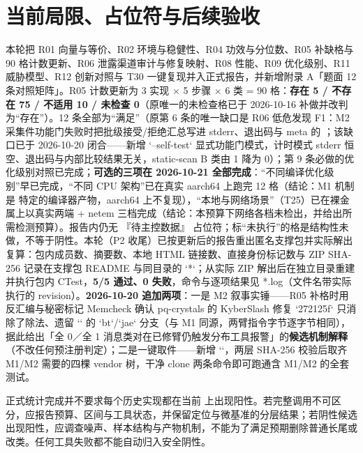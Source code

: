 \documentclass[UTF8,fontset=fandol,11pt,a4paper]{ctexart}
\begin{document}
\section{当前局限、占位符与后续验收}
本轮把 R01 向量与等价、R02 环境与稳健性、R04 功效与分位数、R05 补缺格与 90 格计数更新、R06 泄露渠道审计与修复映射、R08 性能、R09 优化级别、R11 威胁模型、R12 创新对照与 T30 一键复现并入正式报告，并新增附录 A「题面 12 条对照矩阵」。R05 计数更新为 3 实现 \texorpdfstring{$\times$}{x} 5 步骤 \texorpdfstring{$\times$}{x} 6 类 = 90 格：\textbf{存在 5 / 不存在 75 / 不适用 10 / 未检查 0}（原唯一的未检查格已于 2026-10-16 补做并改判为“存在”）。12 条全部为“满足”（原第 6 条的唯一缺口是 R06 低危发现 F1：M2 采集件功能门失败时把批级接受/拒绝汇总写进 stderr、退出码与 meta 的 \texttt{}；该缺口已于 2026-10-20 闭合——新增 `--self-test` 显式功能门模式，计时模式 stderr 恒空、退出码与内部比较结果无关，static-scan B 类由 1 降为 0）；第 9 条必做的优化级别对照已完成；\textbf{可选的三项在 2026-10-21 全部完成}：“不同编译优化级别”早已完成，“不同 CPU 架构”已在真实 aarch64 上跑完 12 格（结论：M1 机制是 \texttt{} 特定的编译器产物，aarch64 上不复现），“本地与网络场景”（T25）已在裸金属上以真实两端 + netem 三档完成（结论：本预算下网络各档未检出，并给出所需检测预算）。报告内仍无 『待主控数据』 占位符；标“未执行”的格是结构性未做，不等于阴性。本轮（P2 收尾）已按更新后的报告重出匿名支撑包并实际解出复算：包内成员数、摘要数、本地 HTML 链接数、直接身份标记数与 ZIP SHA-256 记录在支撑包 README 与同目录的 `*\texttt{}`；从实际 ZIP 解出后在独立目录重建并执行包内 CTest，\textbf{5/5 通过、0 失败}，命令与逐项结果见 \texttt{}*.log（文件名带实际执行的 revision）。\textbf{2026-10-20 追加两项}：一是 M2 叙事实锤——R05 补格时用反汇编与秘密标记 Memcheck 确认 pq-crystals 的 KyberSlash 修复 `272125f` 只消除了除法、遗留 `\texttt{}` 的 `bt`/`jae` 分支（与 M1 同源，两臂指令字节逐字节相同），据此给出「全 0／全 1 消息类对在已修臂仍触发分布工具报警」的\textbf{候选机制解释}（不改任何预注册判定）；二是一键取件——新增 `\texttt{}`，两层 SHA-256 校验后取齐 M1/M2 需要的四棵 vendor 树，干净 clone 两条命令即可跑通含 M1/M2 的全套测试。


正式统计完成并不要求每个历史实现都在当前 \texttt{} 上出现阳性。若完整调用不可区分，应报告预算、区间与工具状态，并保留定位与微基准的分层结果；若阴性候选出现阳性，应调查噪声、样本结构与产物机制，不能为了满足预期删除普通长尾或改类。任何工具失败都不能自动归入安全阴性。
\end{document}
